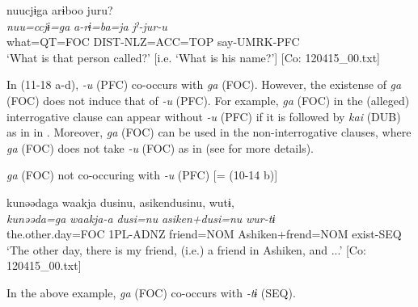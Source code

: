   \ex  
      \glll    nuucjɨga  arɨboo  juru?\\
      \textit{nuu=ccjɨ=ga}  \textit{a-rɨ=ba=ja}  \textit{jˀ-jur-u}\\
      what=QT=FOC  DIST-NLZ=ACC=TOP  say-UMRK-PFC\\
      \glt       ‘What is that person called?’ [i.e. ‘What is his name?’] [Co: 120415\_00.txt]
\z
\z

In (11-18 a-d), \textit{{}-u} (PFC) co-occurs with \textit{ga} (FOC). However, the existense of \textit{ga} (FOC) does not induce that of \textit{{}-u} (PFC). For example, \textit{ga} (FOC) in the (alleged) interrogative clause can appear without \textit{-u} (PFC) if it is followed by \textit{kai} (DUB) as in  in . Moreover, \textit{ga} (FOC) can be used in the non-interrogative clauses, where \textit{ga} (FOC) does not take \textit{{}-u} (FOC) as in  (see  for more details).

\ea\label{ex:11-19}  \textit{ga} (FOC) not co-occuring with \textit{-u} (PFC) [= (10-14 b)]
  
      \glll    kunəədaga  waakja  dusinu,  asikendusinu,  wutɨ,\\
    \textit{kunəəda=ga}  \textit{waakja-a}  \textit{dusi=nu}  \textit{asiken+dusi=nu}  \textit{wur-tɨ}\\
    the.other.day=FOC  1PL-ADNZ  friend=NOM  Ashiken+frend=NOM  exist{}-SEQ\\
    \glt     ‘The other day, there is my friend, (i.e.) a friend in Ashiken, and ...’ [Co: 120415\_00.txt]
\z

In the above example, \textit{ga} (FOC) co-occurs with \textit{{}-tɨ} (SEQ).
